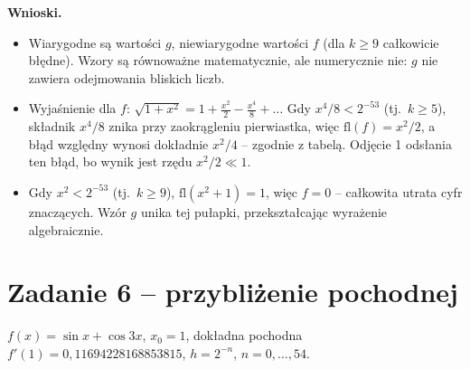 \documentclass[11pt,a4paper]{article}
\begin{document}
\textbf{Wnioski.}
\begin{itemize}
\item Wiarygodne są wartości $g$, niewiarygodne wartości $f$ (dla $k\ge9$ całkowicie błędne). Wzory są równoważne matematycznie, ale numerycznie nie: $g$ nie zawiera odejmowania bliskich liczb.
\item Wyjaśnienie dla $f$: $\sqrt{1+x^2}=1+\tfrac{x^2}{2}-\tfrac{x^4}{8}+\dots$ Gdy $x^4/8<2^{-53}$ (tj.\ $k\ge5$), składnik $x^4/8$ znika przy zaokrągleniu pierwiastka, więc $\mathrm{fl}(f)=x^2/2$, a błąd względny wynosi dokładnie $x^2/4$ -- zgodnie z tabelą. Odjęcie 1 odsłania ten błąd, bo wynik jest rzędu $x^2/2\ll1$.
\item Gdy $x^2<2^{-53}$ (tj.\ $k\ge9$), $\mathrm{fl}(x^2+1)=1$, więc $f=0$ -- całkowita utrata cyfr znaczących. Wzór $g$ unika tej pułapki, przekształcając wyrażenie algebraicznie.
\end{itemize}

\section{Zadanie 6 -- przybliżenie pochodnej}

$f(x)=\sin x+\cos3x$, $x_0=1$, dokładna pochodna $f'(1)=0{,}11694228168853815$, $h=2^{-n}$, $n=0,\dots,54$.
\end{document}
